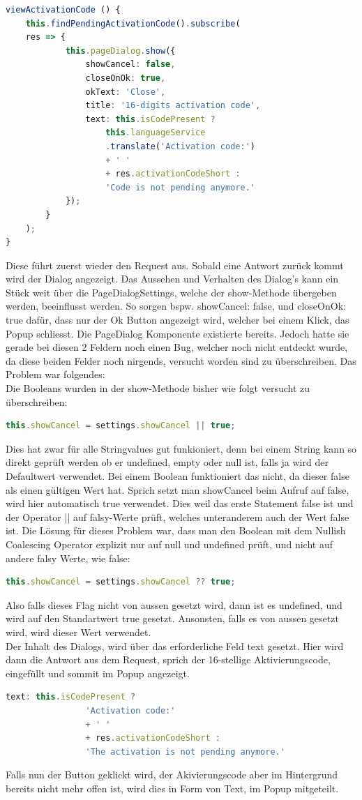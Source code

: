 \begin{lstlisting}[language=TypeScript]
viewActivationCode () {
	this.findPendingActivationCode().subscribe(
	res => {
			this.pageDialog.show({
				showCancel: false,
				closeOnOk: true,
				okText: 'Close',
				title: '16-digits activation code',
				text: this.isCodePresent ?
					this.languageService
					.translate('Activation code:')
					+ ' '
					+ res.activationCodeShort :
					'Code is not pending anymore.'
			});
		}
	);
}
\end{lstlisting}
Diese führt zuerst wieder den Request aus. Sobald eine Antwort zurück kommt wird der Dialog angezeigt. Das Aussehen und Verhalten des Dialog's kann ein Stück weit über die PageDialogSettings, welche der show-Methode übergeben werden, beeinflusst werden. So sorgen bspw. showCancel: false, und closeOnOk: true dafür, dass nur der Ok Button angezeigt wird, welcher bei einem Klick, das Popup schliesst. Die PageDialog Komponente existierte bereits. Jedoch hatte sie gerade bei diesen 2 Feldern noch einen Bug, welcher noch nicht entdeckt wurde, da diese beiden Felder noch nirgends, versucht worden sind zu überschreiben. Das Problem war folgendes:\\
Die Booleans wurden in der show-Methode bisher wie folgt versucht zu überschreiben:
\begin{lstlisting}[language=TypeScript]
this.showCancel = settings.showCancel || true;
\end{lstlisting}
Dies hat zwar für alle Stringvalues gut funkioniert, denn bei einem String kann so direkt geprüft werden ob er undefined, empty oder null ist, falls ja wird der Defaultwert verwendet.
Bei einem Boolean funktioniert das nicht, da dieser false als einen gültigen Wert hat. Sprich setzt man showCancel beim Aufruf auf false, wird hier automatisch true verwendet. Dies weil das erste Statement false ist und der Operator || auf falsy-Werte prüft, welches unteranderem auch der Wert false ist. Die Lösung für dieses Problem war, dass man den Boolean mit dem Nullish Coalescing Operator explizit nur auf null und undefined prüft, und nicht auf andere falsy Werte, wie false:
\begin{lstlisting}[language=TypeScript]
this.showCancel = settings.showCancel ?? true;
\end{lstlisting}
Also falls dieses Flag nicht von aussen gesetzt wird, dann ist es undefined, und wird auf den Standartwert true gesetzt. Ansonsten, falls es von aussen gesetzt wird, wird dieser Wert verwendet.
\\
Der Inhalt des Dialogs, wird über das erforderliche Feld \flqq text\frqq{} gesetzt. Hier wird dann die Antwort aus dem Request, sprich der 16-stellige Aktivierungscode, eingefüllt und sommit im Popup angezeigt.
\begin{lstlisting}[language=TypeScript]
text: this.isCodePresent ? 
				'Activation code:'
				+ ' '
				+ res.activationCodeShort :
				'The activation is not pending anymore.'

\end{lstlisting}
Falls nun der Button geklickt wird, der Akivierungscode aber im Hintergrund bereits nicht mehr offen ist, wird dies in Form von Text, im Popup mitgeteilt. 
